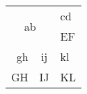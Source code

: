       \begin{center}
      \begin{tabular}{|r|c|l|}
        \hline
        \multicolumn{2}{|c|}{\multirow{2}{*}{ab}} &cd\\
                                                  \cline{3-3}
        \multicolumn{2}{|c|}{}                    &EF\\
        \hline
        gh                    &ij                 &kl\\
        \hline
        GH                    &IJ                 &KL\\
        \hline
      \end{tabular}
    \end{center}




























\newpage